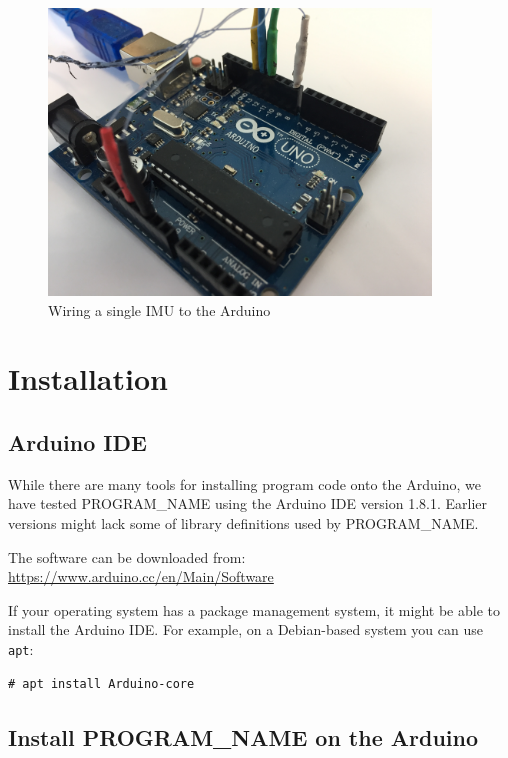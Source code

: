 \documentclass[11pt,letterpaper,article,oneside]{memoir}
\newcommand{\name}{PROGRAM\_NAME}
\begin{document}
\begin{figure}[]
    \begin{center}
        \includegraphics[height=3in]{wiring2}
    \end{center}
    \label{fig:wiring}
    \caption{Wiring a single IMU to the Arduino}
\end{figure}




\chapter{Installation}

\section{Arduino IDE}
While there are many tools for installing program code onto the Arduino, we have
tested \name{} using the Arduino IDE version 1.8.1.
Earlier versions might lack some of library definitions used by \name{}.

The software can be downloaded from:
\url{https://www.arduino.cc/en/Main/Software}

If your operating system has a package management system, it might be able
to install the Arduino IDE. For example, on a Debian-based system you can use
\texttt{apt}:
\begin{verbatim}
# apt install Arduino-core
\end{verbatim}

\section{Install \name{} on the Arduino}
\label{sec:installarduinocode}
\end{document}
